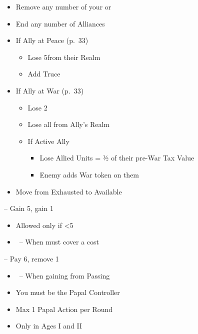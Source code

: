 \documentclass[10pt]{article}
\begin{document}
\begin{itemize}
	\item Remove any number of your \influence or \claims
	\item End any number of Alliances
	\item If Ally at Peace (p.~33)
	\begin{itemize}
		\item Lose 5\influence from their Realm
		\item Add Truce
	\end{itemize}
	\item If Ally at War (p.~33)
	\begin{itemize}
		\item Lose 2\stability
		\item Lose all \influence from Ally's Realm
		\item If Active Ally
		\begin{itemize}
			\item Lose Allied Units = ½ of their pre-War Tax Value
			\item Enemy adds War token on them
		\end{itemize}
	\end{itemize}
\end{itemize}

\begin{itemize}
	\item Move \manpower from Exhausted to Available
\end{itemize}

 -- Gain 5\ducats, gain 1\interest
\begin{itemize}
	\item Allowed only if <5\interest
	\item \reaction~-- When must cover a cost
\end{itemize}
 -- Pay 6\ducats, remove 1\interest
\begin{itemize}
	\item \reaction~-- When gaining \ducats from Passing
\end{itemize}

\begin{itemize}
	\item You must be the Papal Controller
	\item Max 1 Papal Action per Round
	\item Only in Ages I and II
\end{itemize}
\end{document}
